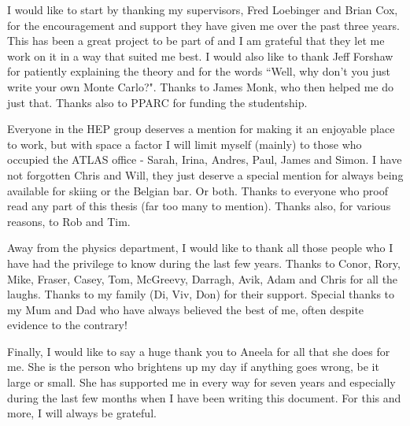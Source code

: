 I would like to start by thanking my supervisors, Fred Loebinger and Brian Cox, for the encouragement and support they have given me over the past three years. This has been a great project to be part of and I am grateful that they let me work on it in a way that suited me best. I would also like to thank Jeff Forshaw for patiently explaining the theory and for the words ``Well, why don't you just write your own Monte Carlo?". Thanks to James Monk, who then helped me do just that. Thanks also to PPARC for funding the studentship.

Everyone in the HEP group deserves a mention for making it an enjoyable place to work, but with space a factor I will limit myself (mainly) to those who occupied the ATLAS office - Sarah, Irina, Andres, Paul, James and Simon. I have not forgotten Chris and Will, they just deserve a special mention for always being available for skiing or the Belgian bar. Or both. Thanks to everyone who proof read any part of this thesis (far too many to mention). Thanks also, for various reasons, to Rob and Tim.

Away from the physics department, I would like to thank all those people who I have had the privilege to know during the last few years. Thanks to Conor, Rory, Mike, Fraser, Casey, Tom, McGreevy, Darragh, Avik, Adam and Chris for all the laughs. Thanks to my family (Di, Viv, Don) for their support. Special thanks to my Mum and Dad who have always believed the best of me, often despite evidence to the contrary! 

Finally, I would like to say a huge thank you to Aneela for all that she does for me. She is the person who  brightens up my day if anything goes wrong, be it large or small. She has supported me in every way for seven years and especially during the last few months when I have been writing this document. For this and more, I will always be grateful.